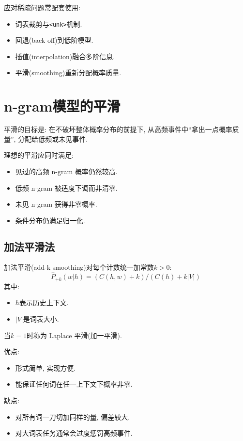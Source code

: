 应对稀疏问题常配套使用:

\begin{itemize}
\item 词表裁剪与\texttt{\textless{}unk\textgreater{}}机制.
\item 回退(back-off)到低阶模型.
\item 插值(interpolation)融合多阶信息.
\item 平滑(smoothing)重新分配概率质量.
\end{itemize}

\section{n-gram模型的平滑}


平滑的目标是: 在不破坏整体概率分布的前提下,
从高频事件中“拿出一点概率质量”, 分配给低频或未见事件.

理想的平滑应同时满足:

\begin{itemize}
\item 见过的高频 n-gram 概率仍然较高.
\item 低频 n-gram 被适度下调而非清零.
\item 未见 n-gram 获得非零概率.
\item 条件分布仍满足归一化.
\end{itemize}

\subsection{加法平滑法}


加法平滑(add-k smoothing)对每个计数统一加常数$k > 0$:
\[
\hat{P}_{+k}(w | h)
  = (C(h, w) + k) / (C(h) + k |V|)
\]
其中:

\begin{itemize}
\item $h$表示历史上下文.
\item $|V|$是词表大小.
\end{itemize}

当$k=1$时称为 Laplace 平滑(加一平滑).

优点:

\begin{itemize}
\item 形式简单, 实现方便.
\item 能保证任何词在任一上下文下概率非零.
\end{itemize}

缺点:

\begin{itemize}
\item 对所有词一刀切加同样的量, 偏差较大.
\item 对大词表任务通常会过度惩罚高频事件.
\end{itemize}

